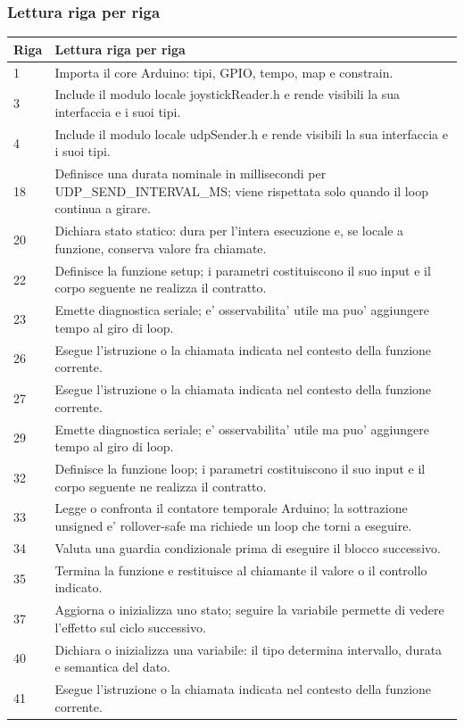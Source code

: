 \documentclass[11pt,a4paper]{article}
\begin{document}
\subsubsection{Lettura riga per riga}
\begin{longtable}{p{}p{}}
\toprule
\textbf{Riga} & \textbf{Lettura riga per riga} \\
\midrule
\endhead
1 & Importa il core Arduino: tipi, GPIO, tempo, map e constrain. \\
3 & Include il modulo locale joystickReader.h e rende visibili la sua interfaccia e i suoi tipi. \\
4 & Include il modulo locale udpSender.h e rende visibili la sua interfaccia e i suoi tipi. \\
18 & Definisce una durata nominale in millisecondi per UDP\_\allowbreak{}SEND\_\allowbreak{}INTERVAL\_\allowbreak{}MS; viene rispettata solo quando il loop continua a girare. \\
20 & Dichiara stato statico: dura per l'intera esecuzione e, se locale a funzione, conserva valore fra chiamate. \\
22 & Definisce la funzione setup; i parametri costituiscono il suo input e il corpo seguente ne realizza il contratto. \\
23 & Emette diagnostica seriale; e' osservabilita' utile ma puo' aggiungere tempo al giro di loop. \\
26 & Esegue l'istruzione o la chiamata indicata nel contesto della funzione corrente. \\
27 & Esegue l'istruzione o la chiamata indicata nel contesto della funzione corrente. \\
29 & Emette diagnostica seriale; e' osservabilita' utile ma puo' aggiungere tempo al giro di loop. \\
32 & Definisce la funzione loop; i parametri costituiscono il suo input e il corpo seguente ne realizza il contratto. \\
33 & Legge o confronta il contatore temporale Arduino; la sottrazione unsigned e' rollover-safe ma richiede un loop che torni a eseguire. \\
34 & Valuta una guardia condizionale prima di eseguire il blocco successivo. \\
35 & Termina la funzione e restituisce al chiamante il valore o il controllo indicato. \\
37 & Aggiorna o inizializza uno stato; seguire la variabile permette di vedere l'effetto sul ciclo successivo. \\
40 & Dichiara o inizializza una variabile: il tipo determina intervallo, durata e semantica del dato. \\
41 & Esegue l'istruzione o la chiamata indicata nel contesto della funzione corrente. \\
\bottomrule
\end{longtable}
\end{document}
